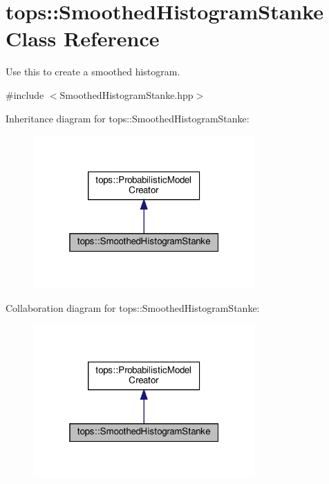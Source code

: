 \hypertarget{classtops_1_1SmoothedHistogramStanke}{}\section{tops\+:\+:Smoothed\+Histogram\+Stanke Class Reference}
\label{classtops_1_1SmoothedHistogramStanke}


Use this to create a smoothed histogram.  




{\ttfamily \#include $<$Smoothed\+Histogram\+Stanke.\+hpp$>$}



Inheritance diagram for tops\+:\+:Smoothed\+Histogram\+Stanke\+:
\nopagebreak
\begin{figure}[H]
\begin{center}
\leavevmode
\includegraphics[width=241pt]{classtops_1_1SmoothedHistogramStanke__inherit__graph}
\end{center}
\end{figure}


Collaboration diagram for tops\+:\+:Smoothed\+Histogram\+Stanke\+:
\nopagebreak
\begin{figure}[H]
\begin{center}
\leavevmode
\includegraphics[width=241pt]{classtops_1_1SmoothedHistogramStanke__coll__graph}
\end{center}
\end{figure}
